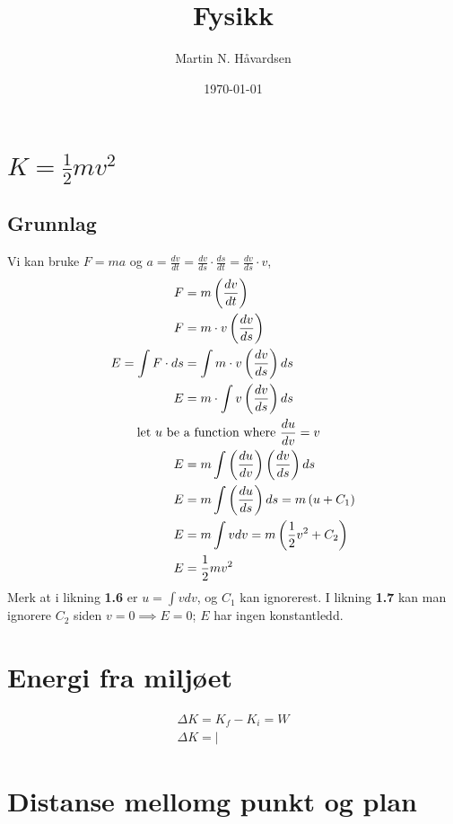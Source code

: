 \documentclass{article}
\title{Fysikk}
\author{Martin N. Håvardsen}
\date{\today}
\numberwithin{equation}{section}
\begin{document}
\maketitle
\section{$K=\frac 1 2 mv^2$}
  \subsection{Grunnlag}
  Vi kan bruke $F=ma$ og $a=\frac{dv}{dt}=\frac{dv}{ds}\cdot\frac{ds}{dt}=\frac{dv}{ds}\cdot v$,
  \begin{align}
    F&=m\left(\frac{dv}{dt}\right) \\
    F&=m\cdot v\left(\frac{dv}{ds}\right)\\
    E=\int F\cdot ds&=\int m\cdot v\left(\frac{dv}{ds}\right) ds \\
    E&=m\cdot \int v\left(\frac{dv}{ds}\right)ds \\
    \text{let $u$ be } &\text{a function where } \frac{du}{dv}=v\notag\\
    E&=m\int\left(\frac{du}{dv}\right)\left(\frac{dv}{ds}\right)ds \\
    E&=m\int\left(\frac{du}{ds}\right)ds=m\left(u+C_1\right) \\
    E&=m\int vdv=m\left(\frac 1 2 v^2+C_2\right) \\
    E&=\frac 1 2 mv^2
  \end{align}
Merk at i likning \textbf{1.6} er $u=\displaystyle\int vdv$, og $C_1$ kan ignorerest. I likning \textbf{1.7} kan man ignorere $C_2$ siden $v=0\implies E=0$; $E$ har ingen konstantledd. 
\section{Energi fra miljøet}
  \begin{align}
    \Delta K= K_f-K_i=W \\
    \left.\Delta K= \text{}\right|
  \end{align}

\section{Distanse mellomg punkt og plan}\label{sec:Distanse mellomg punkt og plan} %
\end{document}
